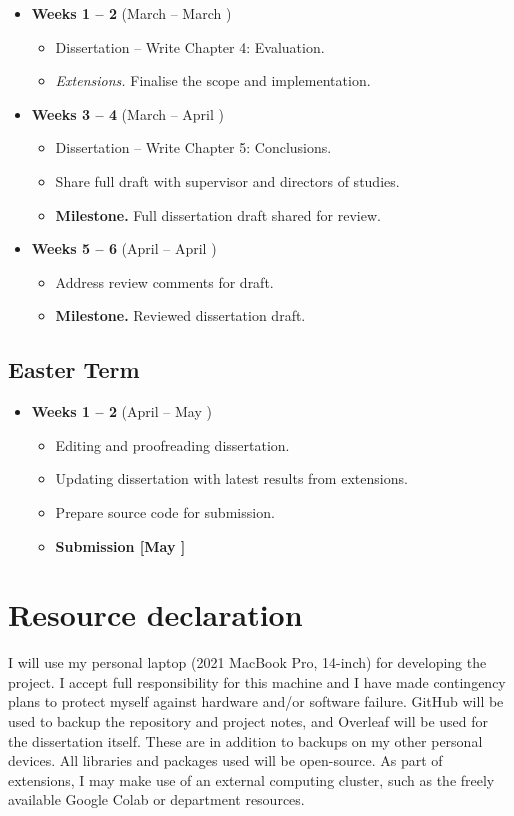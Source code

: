 \begin{itemize}
    \item \textbf{Weeks 1 -- 2} (March  -- March )  \begin{itemize}
        \item Dissertation -- Write Chapter 4: Evaluation.
        \item \textit{Extensions.} Finalise the scope and implementation.
    \end{itemize}
    \item \textbf{Weeks 3 -- 4} (March  -- April )  \begin{itemize}
        \item Dissertation -- Write Chapter 5: Conclusions.
        \item Share full draft with supervisor and directors of studies. 
        \item \textbf{Milestone.} Full dissertation draft shared for review.
    \end{itemize}
    \item \textbf{Weeks 5 -- 6} (April  -- April )  \begin{itemize}
        \item Address review comments for draft.
        \item \textbf{Milestone.} Reviewed dissertation draft.
    \end{itemize}
\end{itemize}

\subsection{Easter Term}

\begin{itemize}
    \item \textbf{Weeks 1 -- 2} (April  -- May ) \begin{itemize}
        \item Editing and proofreading dissertation.
        \item Updating dissertation with latest results from extensions.
        \item Prepare source code for submission.
        \item \textbf{Submission [May ]}
    \end{itemize}
\end{itemize}

\section{Resource declaration}

I will use my personal laptop (2021 MacBook Pro, 14-inch) for developing the project. I accept full responsibility for this machine and I have made contingency plans to protect myself against hardware and/or software failure. GitHub will be used to backup the repository and project notes, and Overleaf will be used for the dissertation itself. These are in addition to backups on my other personal devices. All libraries and packages used will be open-source. As part of extensions, I may make use of an external computing cluster, such as the freely available Google Colab or department resources.
